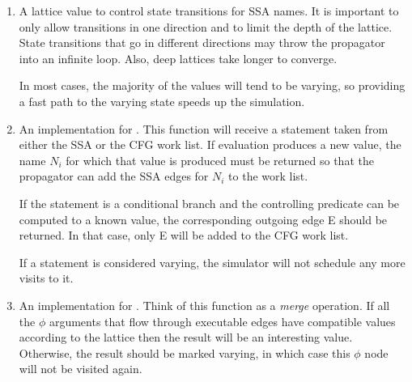 \begin{enumerate}
\item	A lattice value to control state transitions for SSA
	names.  It is important to only allow transitions in one
	direction and to limit the depth of the lattice.  State
	transitions that go in different directions may throw the
	propagator into an infinite loop.  Also, deep lattices
	take longer to converge.

	In most cases, the majority of the values will tend to be
	varying, so providing a fast path to the varying state
	speeds up the simulation.

\item	An implementation for .  This
	function will receive a statement taken from either the
	SSA or the CFG work list.  If evaluation produces a
	new value, the name $N_i$ for which that value is
	produced must be returned so that the propagator can add
	the SSA edges for $N_i$ to the work list.

	If the statement is a conditional branch and the
	controlling predicate can be computed to a known value,
	the corresponding outgoing edge E should be returned.
	In that case, only E will be added to the CFG work list.

	If a statement is considered varying, the simulator will
	not schedule any more visits to it.

\item	An implementation for .  Think
	of this function as a \textit{merge} operation.  If all
	the $\phi$ arguments that flow through executable edges
	have compatible values according to the lattice then the
	result will be an interesting value.  Otherwise, the
	result should be marked varying, in which case this
	$\phi$ node will not be visited again.
\end{enumerate}




